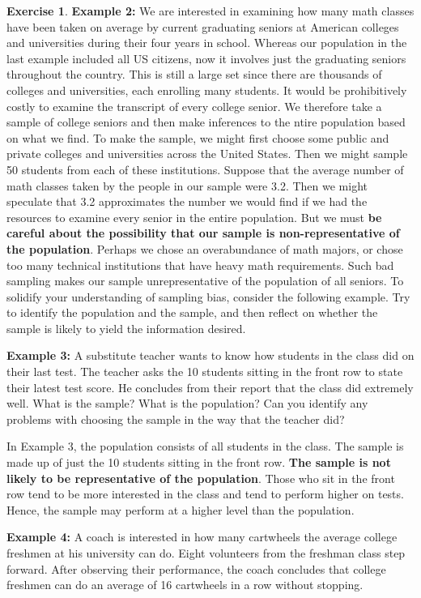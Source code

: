 \documentclass[
  12pt,
  oneside]{book}
\theoremstyle{definition}
\theoremstyle{definition}
\theoremstyle{definition}
\newtheorem{exercise}{Exercise}[chapter]
\theoremstyle{definition}
\theoremstyle{remark}
\begin{document}
\begin{exercise}
\textbf{Example 2:} We are interested in examining how many math classes have
been taken on average by current graduating seniors at American colleges
and universities during their four years in school. Whereas our population in
the last example included all US citizens, now it involves just the graduating
seniors throughout the country. This is still a large set since there are
thousands of colleges and universities, each enrolling many students. It would be
prohibitively costly to examine the transcript of every college senior. We
therefore take a sample of college seniors and then make inferences to the
ntire population based on what we find. To make the sample, we might first
choose some public and private colleges and universities across the United
States. Then we might sample 50 students from each of these institutions.
Suppose that the average number of math classes taken by the people in our
sample were 3.2. Then we might speculate that 3.2 approximates the number
we would find if we had the resources to examine every senior in the entire
population. But we must \textbf{be careful about the possibility that our sample is
non-representative of the population}. Perhaps we chose an overabundance of
math majors, or chose too many technical institutions that have heavy math
requirements. Such bad sampling makes our sample unrepresentative of the
population of all seniors.
To solidify your understanding of sampling bias, consider the following
example. Try to identify the population and the sample, and then reflect on
whether the sample is likely to yield the information desired.

\textbf{Example 3:} A substitute teacher wants to know how students in the class
did on their last test. The teacher asks the 10 students sitting in the front row
to state their latest test score. He concludes from their report that the class
did extremely well. What is the sample? What is the population? Can you
identify any problems with choosing the sample in the way that the teacher
did?

In Example 3, the population consists of all students in the class. The sample is
made up of just the 10 students sitting in the front row. \textbf{The sample is not likely to
be representative of the population}. Those who sit in the front row tend to be more
interested in the class and tend to perform higher on tests. Hence, the sample may
perform at a higher level than the population.

\textbf{Example 4:} A coach is interested in how many cartwheels the average
college freshmen at his university can do. Eight volunteers from the
freshman class step forward. After observing their performance, the coach
concludes that college freshmen can do an average of 16 cartwheels in a row
without stopping.


\end{exercise}
\end{document}
